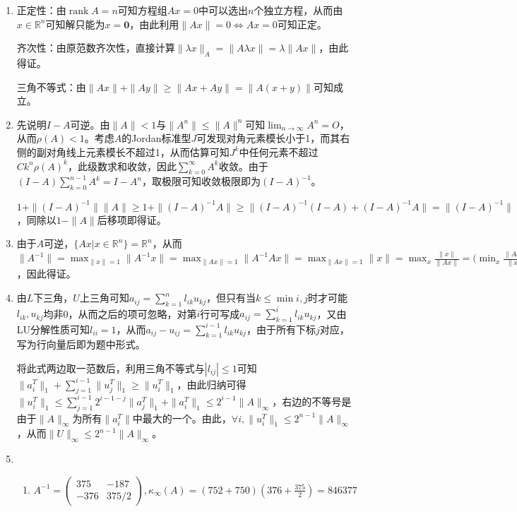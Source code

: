 \documentclass[a4paper,UTF8,fontset=windows]{ctexart}
\DeclareMathOperator{\rank}{rank}
\begin{document}
\begin{enumerate}
仅当：若$A$不正定，由定义存在非零的$x$使得$x^TAx\le0$，此时不满足正定性或根号内为负数，不为范数。

\item
正定性：由$\rank A=n$可知方程组$Ax=0$中可以选出$n$个独立方程，从而由$x\in\mathbb{R}^n$可知解只能为$x=\mathbf{0}$，由此利用$\|Ax\|=0\Leftrightarrow Ax=0$可知正定。

齐次性：由原范数齐次性，直接计算$\|\lambda x\|_A=\|A\lambda x\|=\lambda\|Ax\|$，由此得证。

三角不等式：由$\|Ax\|+\|Ay\|\ge\|Ax+Ay\|=\|A(x+y)\|$可知成立。

\item
先说明$I-A$可逆。由$\|A\|<1$与$\|A^n\|\le\|A\|^n$可知$\lim_{n\to\infty}A^n=O$，从而$\rho(A)<1$。考虑$A$的Jordan标准型$J$可发现对角元素模长小于1，而其右侧的副对角线上元素模长不超过1，从而估算可知$J^k$中任何元素不超过$Ck^n\rho(A)^k$，此级数求和收敛，因此$\sum_{k=0}^\infty A^k$收敛。由于$(I-A)\sum_{k=0}^{n-1}A^k=I-A^n$，取极限可知收敛极限即为$(I-A)^{-1}$。

$1+\|(I-A)^{-1}\|\|A\|\ge1+\|(I-A)^{-1}A\|\ge\|(I-A)^{-1}(I-A)+(I-A)^{-1}A\|=\|(I-A)^{-1}\|$，同除以$1-\|A\|$后移项即得证。

\item
由于$A$可逆，$\{Ax|x\in\mathbb{R}^n\}=\mathbb{R}^n$，从而$\|A^{-1}\|=\max_{\|x\|=1}\|A^{-1}x\|=\max_{\|Ax\|=1}\|A^{-1}Ax\|=\max_{\|Ax\|=1}\|x\|=\max_x\frac{\|x\|}{\|Ax\|}=\big(\min_x\frac{\|Ax\|}{\|x\|}\big)^{-1}=\big(\min_{\|x\|=1}\|Ax\|\big)^{-1}$，因此得证。

\item
由$L$下三角，$U$上三角可知$a_{ij}=\sum_{k=1}^{n}l_{ik}u_{kj}$，但只有当$k\le\min{i,j}$时才可能$l_{ik},u_{kj}$均非0，从而之后的项可忽略，对第$i$行可写成$a_{ij}=\sum_{k=1}^{i}l_{ik}u_{kj}$，又由LU分解性质可知$l_{ii}=1$，从而$a_{ij}-u_{ij}=\sum_{k=1}^{i-1}l_{ik}u_{kj}$，由于所有下标$j$对应，写为行向量后即为题中形式。

将此式两边取一范数后，利用三角不等式与$|l_{ij}|\le1$可知$\|a_i^T\|_1+\sum_{j=1}^{i-1}\|u_j^T\|_1\ge\|u_i^T\|_1$，由此归纳可得$\|u_i^T\|_1\le\sum_{j=1}^{i-1}2^{i-1-j}\|a_j^T\|_1+\|a_i^T\|_1\le2^{i-1}\|A\|_\infty$，右边的不等号是由于$\|A\|_\infty$为所有$\|a_i^T\|$中最大的一个。由此，$\forall i,\|u_i^T\|_1\le2^{n-1}\|A\|_\infty$，从而$\|U\|_\infty\le2^{n-1}\|A\|_\infty$。

\item
\begin{enumerate}[(1)]
\item
$A^{-1}=\begin{pmatrix}375&-187\\-376&375/2\end{pmatrix},\kappa_\infty(A)=(752+750)(376+\frac{375}{2})=846377$


\end{enumerate}
\end{enumerate}
\end{document}
